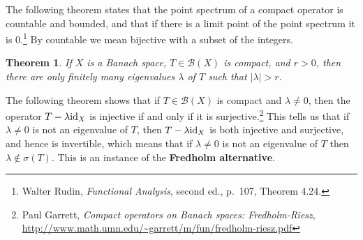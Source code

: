 \documentclass{article}
\newcommand{\id}{\ensuremath\mathrm{id}}
\newtheorem{theorem}{Theorem}
\begin{document}
The following theorem states  that the point spectrum of a compact operator is countable and bounded, and that if there is a limit point of the point spectrum
it is $0$.\footnote{Walter Rudin, {\em Functional Analysis}, second ed., p.~107, Theorem 4.24.} By countable we mean bijective with a subset
of the integers.

\begin{theorem}
If $X$ is a Banach space, $T \in \mathscr{B}(X)$ is compact, and $r>0$, then there are only finitely many eigenvalues $\lambda$ of $T$ such that $|\lambda| > r$.
\end{theorem}



The following theorem shows that if $T \in \mathscr{B}(X)$ is compact and $\lambda \neq 0$, then the operator
$T-\lambda \id_X$ is injective if and only if it is surjective.\footnote{Paul Garrett, {\em Compact operators on Banach spaces: Fredholm-Riesz}, \url{http://www.math.umn.edu/~garrett/m/fun/fredholm-riesz.pdf}} This tells us that if $\lambda \neq 0$ is not an eigenvalue of $T$, then $T - \lambda \id_X$ is both injective and surjective, and hence is invertible, which means that if $\lambda \neq 0$ is not an eigenvalue of $T$ then $\lambda \not \in \sigma(T)$.
This is an instance of the \textbf{Fredholm alternative}.
\end{document}
